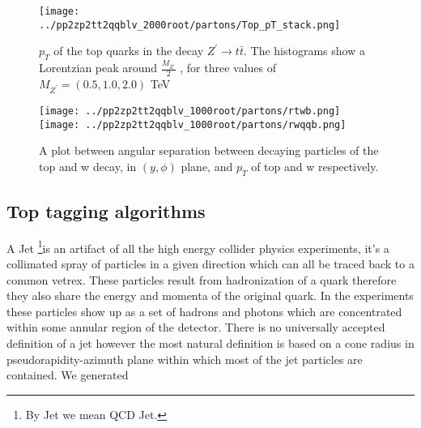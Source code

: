 \documentclass[12pt,a4paper]{article}		%
\begin{document}
 	\begin{figure}[h]
	\begin{centering}	
		\texttt{[image: ../pp2zp2tt2qqblv\_2000root/partons/Top\_pT\_stack.png]} 
		\caption{ $p_T$ of the top quarks in the decay $ Z^\prime \to t \bar{t}$. The histograms show a Lorentzian peak around $\frac{M_{Z^\prime}}{2}$ , for three values of $M_{Z^\prime} = (0.5,1.0 ,2.0)$ TeV}
		\label{toppt}
		\centering
	\end{centering} 		
\end{figure}   


\newpage
 	\begin{figure}[h]
 		\begin{centering}	
 			\texttt{[image: ../pp2zp2tt2qqblv\_1000root/partons/rtwb.png]} 
 			\texttt{[image: ../pp2zp2tt2qqblv\_1000root/partons/rwqqb.png]}
 			\caption{A plot between angular separation between decaying particles of the top and w decay, in $(y,\phi)$ plane, and $p_T$ of top and w respectively.}
 			\label{rwbt}
 			\centering
 		\end{centering} 		
 	\end{figure}   
 
 
\subsection{Top tagging algorithms}

	A Jet \footnote{By Jet we mean QCD Jet.}is an artifact of all the high energy collider physics experiments, it's a collimated spray of particles in a given direction which can all be traced back to a common vetrex. These particles result from hadronization of a quark therefore they also share the energy and momenta of the original quark. In the experiments these particles show up as a set of hadrons and photons which are concentrated within some annular region of the detector. There is no universally accepted definition of a jet however the most natural definition is based on a cone radius in pseudorapidity-azimuth plane within which most of the jet particles are contained. We  generated 
	
\end{document}
